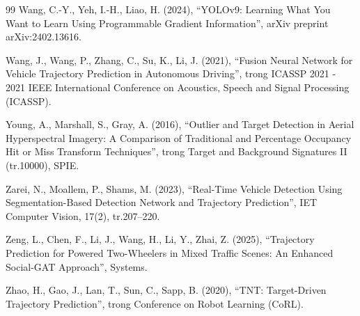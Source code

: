 \begin{thebibliography}{99}
Wang, C.-Y., Yeh, I.-H., Liao, H. (2024), 
“YOLOv9: Learning What You Want to Learn Using Programmable Gradient Information”, 
arXiv preprint arXiv:2402.13616.

Wang, J., Wang, P., Zhang, C., Su, K., Li, J. (2021), 
“Fusion Neural Network for Vehicle Trajectory Prediction in Autonomous Driving”, 
trong ICASSP 2021 - 2021 IEEE International Conference on Acoustics, Speech and Signal Processing (ICASSP).

Young, A., Marshall, S., Gray, A. (2016), 
“Outlier and Target Detection in Aerial Hyperspectral Imagery: A Comparison of Traditional and Percentage Occupancy Hit or Miss Transform Techniques”, 
trong Target and Background Signatures II (tr.10000), SPIE.

Zarei, N., Moallem, P., Shams, M. (2023), 
“Real-Time Vehicle Detection Using Segmentation-Based Detection Network and Trajectory Prediction”, 
IET Computer Vision, 17(2), tr.207--220.

Zeng, L., Chen, F., Li, J., Wang, H., Li, Y., Zhai, Z. (2025), 
“Trajectory Prediction for Powered Two-Wheelers in Mixed Traffic Scenes: An Enhanced Social-GAT Approach”, 
Systems.

Zhao, H., Gao, J., Lan, T., Sun, C., Sapp, B. (2020), 
“TNT: Target-Driven Trajectory Prediction”, 
trong Conference on Robot Learning (CoRL).

\end{thebibliography}
\endgroup